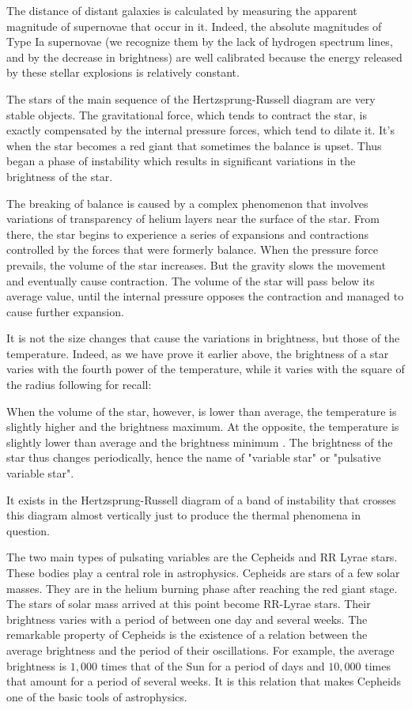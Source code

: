 	The distance of distant galaxies is calculated by measuring the apparent magnitude of supernovae that occur in it. Indeed, the absolute magnitudes of Type Ia supernovae (we recognize them by the lack of hydrogen spectrum lines, and by the decrease in brightness) are well calibrated because the energy released by these stellar explosions is relatively constant.
	
	The stars of the main sequence of the Hertzsprung-Russell diagram are very stable objects. The gravitational force, which tends to contract the star, is exactly compensated by the internal pressure forces, which tend to dilate it. It's when the star becomes a red giant that sometimes the balance is upset. Thus began a phase of instability which results in significant variations in the brightness of the star.

	The breaking of balance is caused by a complex phenomenon that involves variations of transparency of helium layers near the surface of the star. From there, the star begins to experience a series of expansions and contractions controlled by the forces that were formerly balance. When the pressure force prevails, the volume of the star increases. But the gravity slows the movement and eventually cause contraction. The volume of the star will pass below its average value, until the internal pressure opposes the contraction and managed to cause further expansion.

	It is not the size changes that cause the variations in brightness, but those of the temperature. Indeed, as we have prove it earlier above, the brightness of a star varies with the fourth power of the temperature, while it varies with the square of the radius following for recall:
	
	When the volume of the star, however, is lower than average, the temperature is slightly higher and the brightness maximum. At the opposite, the temperature is slightly lower than average and the brightness minimum . The brightness of the star thus changes periodically, hence the name of "variable star" or "pulsative variable star".

	It exists in the Hertzsprung-Russell diagram of a band of instability that crosses this diagram almost vertically just to produce the thermal phenomena in question.

	The two main types of pulsating variables are the Cepheids and RR Lyrae stars. These bodies play a central role in astrophysics. Cepheids are stars of a few solar masses. They are in the helium burning phase after reaching the red giant stage. The stars of solar mass arrived at this point become RR-Lyrae stars. Their brightness varies with a period of between one day and several weeks. The remarkable property of Cepheids is the existence of a relation between the average brightness and the period of their oscillations. For example, the average brightness is $1,000$ times that of the Sun for a period of days and $10,000$ times that amount for a period of several weeks. It is this relation that makes Cepheids one of the basic tools of astrophysics.
	
